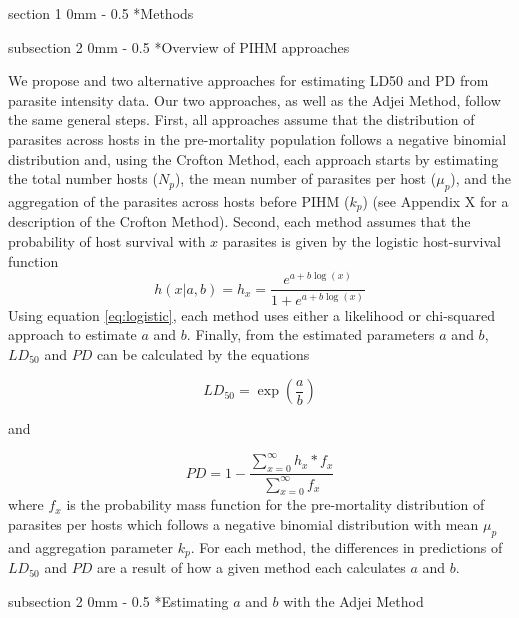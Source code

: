 \documentclass[12pt, a4paper]{article}
\makeatletter
\renewcommand{\section}{\@startsection
{section}%
{1}%
{0mm}%
{-\baselineskip}%
{0.5\baselineskip}%
{\normalfont\bf\large}} %
\renewcommand{\subsection}{\@startsection
{subsection}%
{2}%
{0mm}%
{-\baselineskip}%
{0.5\baselineskip}%
{\normalfont\bf}} %
\makeatother
\begin{document}
\doublespacing

\section*{Methods}


\subsection*{Overview of PIHM approaches}

We propose and two alternative approaches for estimating LD50 and PD from
parasite intensity data.  Our two approaches, as well as the Adjei Method,
follow the same general steps.  First, all approaches assume that the
distribution of parasites across hosts in the pre-mortality population follows
a negative binomial distribution and, using the Crofton Method, each approach
starts by estimating the total number hosts  ($N_p$), the mean number of
parasites per host ($\mu_p$), and the aggregation of the parasites across hosts
before PIHM ($k_p$) (see Appendix X for a description of the Crofton Method).
Second, each method assumes that the probability of host survival with $x$ parasites is given by the logistic host-survival function
\begin{equation}
    h(x | a, b) = h_x = \dfrac{e^{a + b \log(x)}}{1 + e^{a + b \log(x)}}
    \label{eq:logistic}
\end{equation}
Using equation \ref{eq:logistic}, each method uses either a likelihood or chi-squared approach to estimate $a$ and $b$.  Finally, from the estimated parameters $a$ and $b$,
$LD_{50}$ and $PD$ can be calculated by the equations \citep{Adjei1986}

\begin{equation}
    LD_{50} = \exp(\frac{a}{b})
    \label{eq:ld50}
\end{equation}

and

\begin{equation}
    PD = 1 -  \dfrac{\sum_{x=0}^\infty h_x * f_x}{\sum_{x=0}^\infty f_x}
    \label{eq:pd}
\end{equation}
where $f_x$ is the probability mass function for the pre-mortality distribution of parasites per hosts which follows a negative binomial distribution with mean $\mu_p$ and aggregation parameter $k_p$. For
each method, the differences in predictions of
$LD_{50}$ and $PD$ are a result of how a given method each calculates $a$ and $b$.

\subsection*{Estimating $a$ and $b$ with the Adjei Method}
\end{document}
